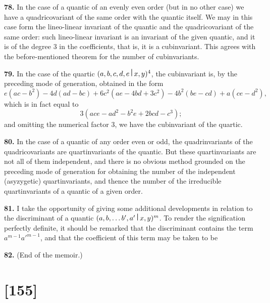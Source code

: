 \documentclass[11pt,a4paper]{book}
\begin{document}
\begin{center}
\medskip
\noindent\textbf{78.} In the case of a quantic of an evenly even order (but in no other case) we have a quadricovariant of the same order with the quantic itself. We may in this case form the lineo-linear invariant of the quantic and the quadricovariant of the same order: such lineo-linear invariant is an invariant of the given quantic, and it is of the degree 3 in the coefficients, that is, it is a cubinvariant. This agrees with the before-mentioned theorem for the number of cubinvariants.

\medskip
\noindent\textbf{79.} In the case of the quartic $(a,b,c,d,e\,\raisebox{0.5ex}{\textbf{\textbar}}\,x,y)^4$, the cubinvariant is, by the preceding mode of generation, obtained in the form
\[e(ac-b^2) - 4d(ad-bc) + 6c^2(ae-4bd+3c^2) - 4b^2(be-cd) + a(ce-d^2),\]
which is in fact equal to
\[3(ace - ad^2 - b^2e + 2bcd - c^3);\]
and omitting the numerical factor 3, we have the cubinvariant of the quartic.

\medskip
\noindent\textbf{80.} In the case of a quantic of any order even or odd, the quadrinvariants of the quadricovariants are quartinvariants of the quantic. But these quartinvariants are not all of them independent, and there is no obvious method grounded on the preceding mode of generation for obtaining the number of the independent (asyzygetic) quartinvariants, and thence the number of the irreducible quartinvariants of a quantic of a given order.

\medskip
\noindent\textbf{81.} I take the opportunity of giving some additional developments in relation to the discriminant of a quantic $(a,b,\ldots b',a'\,\raisebox{0.5ex}{\textbf{\textbar}}\,x,y)^m$. To render the signification perfectly definite, it should be remarked that the discriminant contains the term $a^{m-1}a'^{m-1}$, and that the coefficient of this term may be taken to be

\newpage

\medskip
\noindent\textbf{82.} (End of the memoir.)
\clearpage



\section*{[155]}


\end{center}
\end{document}
